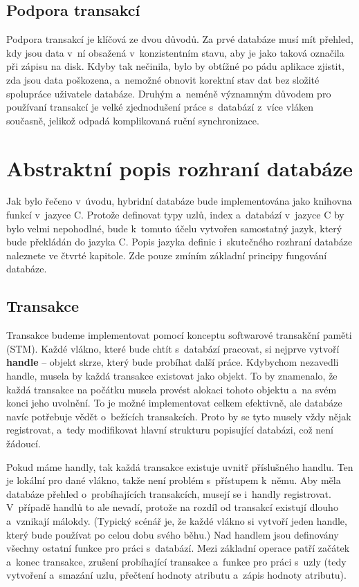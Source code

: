 \subsection{Podpora transakcí}
Podpora transakcí je klíčová ze dvou důvodů. Za prvé databáze musí mít přehled,
kdy jsou data v~ní obsažená v~konzistentním stavu, aby je jako taková označila
při zápisu na disk. Kdyby tak nečinila, bylo by obtížné po pádu aplikace zjistit,
zda jsou data poškozena, a~nemožné obnovit korektní stav dat bez složité
spolupráce uživatele databáze. Druhým a~neméně významným důvodem pro používaní
transakcí je velké zjednodušení práce s~databází z~více vláken současně, jelikož
odpadá komplikovaná ruční synchronizace.


\section{Abstraktní popis rozhraní databáze}
Jak bylo řečeno v~úvodu, hybridní databáze bude implementována jako knihovna funkcí
v~jazyce C. Protože definovat typy uzlů, index a~databází v~jazyce C by bylo velmi
nepohodlné, bude k~tomuto účelu vytvořen samostatný jazyk, který bude překládán
do jazyka C. Popis jazyka definic i~skutečného rozhraní databáze naleznete 
ve čtvrté kapitole.
Zde pouze zmíním základní principy fungování databáze.

\subsection{Transakce}
Transakce budeme implementovat pomocí konceptu softwarové transakční paměti (STM).
Každé vlákno, které bude chtít s~databází pracovat, si nejprve vytvoří {\bf handle}
-- objekt skrze, který bude probíhat další práce. Kdybychom nezavedli handle,
musela by každá transakce existovat jako objekt. To by znamenalo, že každá transakce
na počátku musela provést alokaci tohoto objektu a~na svém konci jeho uvolnění.
To je možné implementovat celkem efektivně, ale databáze navíc potřebuje
vědět o~bežících transakcích. Proto by se tyto musely vždy nějak registrovat,
a~tedy modifikovat hlavní strukturu popisující databázi, což není žádoucí.

Pokud máme handly, tak každá transakce existuje uvnitř příslušného handlu. Ten je
lokální pro dané vlákno, takže není problém s~přístupem k~němu. Aby měla databáze
přehled o~probíhajících transakcích, musejí se i~handly registrovat. V~případě handlů
to ale nevadí, protože na rozdíl od transakcí existují dlouho a~vznikají málokdy.
(Typický scénář je, že každé vlákno si vytvoří jeden handle, který bude používat po
celou dobu svého běhu.)
Nad handlem jsou definovány všechny ostatní funkce pro práci s~databází. Mezi základní
operace patří začátek a~konec transakce, zrušení probíhající transakce a~funkce
pro práci s~uzly (tedy vytvoření a~smazání uzlu, přečtení hodnoty atributu
a~zápis hodnoty atributu). 

